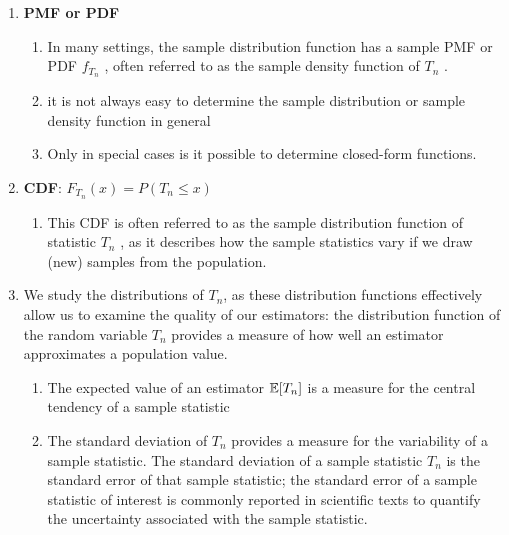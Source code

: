\begin{enumerate}
    \item \textbf{PMF or PDF}
    \hfill \cite{statistics/book/Statistics-for-Data-Scientists/Maurits-Kaptein}
    \begin{enumerate}
        \item In many settings, the sample distribution function has a sample PMF or PDF $f _{T_n}$ , often referred to as the sample density function of $T_n$ .
        \hfill \cite{statistics/book/Statistics-for-Data-Scientists/Maurits-Kaptein}

        \item  it is not always easy to determine the sample distribution or sample density function in general
        \hfill \cite{statistics/book/Statistics-for-Data-Scientists/Maurits-Kaptein}

        \item Only in special cases is it possible to determine closed-form functions.
        \hfill \cite{statistics/book/Statistics-for-Data-Scientists/Maurits-Kaptein}
    \end{enumerate}

    \item \textbf{CDF}: $F_{T_n} (x) = P (T_n \leq x)$
    \hfill \cite{statistics/book/Statistics-for-Data-Scientists/Maurits-Kaptein}
    \begin{enumerate}
        \item This CDF is often referred to as the sample distribution function of statistic $T_n$ , as it describes how the sample statistics vary if we draw (new) samples from the population.
        \hfill \cite{statistics/book/Statistics-for-Data-Scientists/Maurits-Kaptein}

    \end{enumerate}

    \item We study the distributions of $T_n$, as these distribution functions effectively allow us to examine the quality of our estimators: the distribution function of the random variable $T_n$ provides a measure of how well an estimator approximates a population value.
    \begin{enumerate}
        \item The expected value of an estimator $\mathbb{E}[T_n]$ is a measure for the central tendency of a sample statistic
        \hfill \cite{statistics/book/Statistics-for-Data-Scientists/Maurits-Kaptein}

        \item The standard deviation of $T_n$ provides a measure for the variability of a sample statistic.
        The standard deviation of a sample statistic $T_n$ is the standard error of that sample statistic;
        the standard error of a sample statistic of interest is commonly reported in scientific texts to quantify the uncertainty associated with the sample statistic.
        \hfill \cite{statistics/book/Statistics-for-Data-Scientists/Maurits-Kaptein}
    \end{enumerate}
\end{enumerate}


